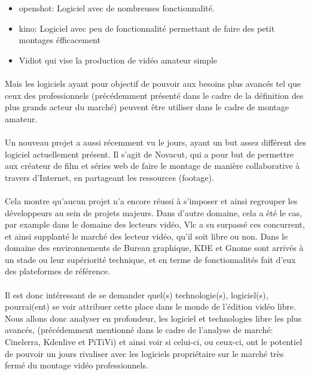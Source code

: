 \begin {itemize}
  \item {openshot: Logiciel avec de nombreuses fonctionnalité.} \item
  {kino: Logiciel avec peu de fonctionnalité permettant de faire des
    petit montages éfficacement}
  \item {Vidiot qui vise la production de vidéo amateur simple}
\end {itemize}

\paragraph {}

Mais les logiciels ayant pour objectif de pouvoir aux besoins plus
avancés tel que ceux des professionnels (précédemment présenté
dans le cadre de la définition des plus grands acteur du marché)
peuvent être utiliser dans le cadre de montage amateur.

\paragraph{}

Un nouveau projet a aussi récemment vu le jours, ayant un but assez
différent des logiciel actuellement présent. Il s'agit de Novacut,
qui a pour but de permettre aux créateur de film et séries web de
faire le montage de manière collaborative à travers d'Internet, en
partageant les ressources (footage).

\paragraph{}

Cela montre qu'aucun projet n'a encore réussi à s'imposer et ainsi
regrouper les développeurs au sein de projets majeurs. Dans d'autre
domaine, cela a été le cas, par example dans le domaine des lecteurs
vidéo, Vlc a su surpassé ces concurrent, et ainsi supplanté le
marché des lecteur vidéo, qu'il soit libre ou non. Dans le domaine
des environnements de Bureau graphique, KDE et Gnome sont arrivés à un
stade ou leur supériorité technique, et en terme de fonctionnalités
fait d'eux des plateformes de référence.

\paragraph{}

Il est donc intéressant de se demander quel(s) technologie(s),
logiciel(s), pourrai(ent) se voir attribuer cette place dans le monde
de l'édition vidéo libre. Nous allons donc analyser en profondeur,
les logiciel et technologies libre les plus avancés, (précédemment
mentionné dans le cadre de l'analyse de marché: Cinelerra, Kdenlive et
PiTiVi) et ainsi voir si celui-ci, ou ceux-ci, ont le potentiel de pouvoir
un jours rivaliser avec les logiciels propriétaire sur le marché très
fermé du montage vidéo professionnels.

